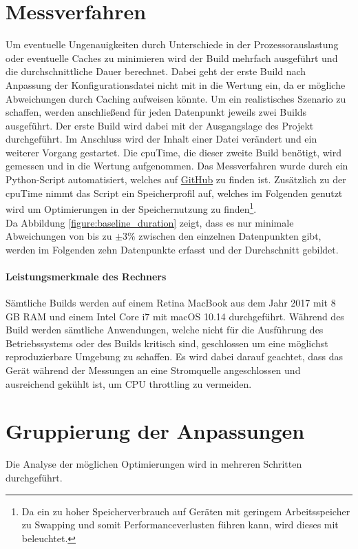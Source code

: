 \documentclass[11pt]{report}
\begin{document}
		\section{Messverfahren}
			Um eventuelle Ungenauigkeiten durch Unterschiede in der Prozessorauslastung oder eventuelle Caches zu minimieren wird der Build mehrfach ausgeführt und die durchschnittliche Dauer berechnet. Dabei geht der erste Build nach Anpassung der Konfigurationsdatei nicht mit in die Wertung ein, da er mögliche Abweichungen durch Caching aufweisen könnte. Um ein realistisches Szenario zu schaffen, werden anschließend für jeden Datenpunkt jeweils zwei Builds ausgeführt. Der erste Build wird dabei mit der Ausgangslage des Projekt durchgeführt. Im Anschluss wird der Inhalt einer Datei verändert und ein weiterer Vorgang gestartet. Die \Gls{cpuTime}, die dieser zweite Build benötigt, wird gemessen und in die Wertung aufgenommen. Das Messverfahren wurde durch ein Python-Script automatisiert, welches auf \href{https://github.com/TexNAK/WebBundlerOptimization/blob/40c8c00dee7af6970bc82c29e2fc0f3cfd6c12eb/webpack-project/runBuilds.py}{GitHub} zu finden ist. Zusätzlich zu der \Gls{cpuTime} nimmt das Script ein Speicherprofil auf, welches im Folgenden genutzt wird um Optimierungen in der Speichernutzung zu finden\footnote{Da ein zu hoher Speicherverbrauch auf Geräten mit geringem Arbeitsspeicher zu Swapping und somit Performanceverlusten führen kann, wird dieses mit beleuchtet.}.\\
			Da Abbildung \ref{figure:baseline_duration} zeigt, dass es nur minimale Abweichungen von bis zu $\pm 3 \%$ zwischen den einzelnen Datenpunkten gibt, werden im Folgenden zehn Datenpunkte erfasst und der Durchschnitt gebildet.
			
			\paragraph{Leistungsmerkmale des Rechners} Sämtliche Builds werden auf einem Retina MacBook aus dem Jahr 2017 mit 8 GB RAM und einem Intel Core i7 mit macOS 10.14 durchgeführt. Während des Build werden sämtliche Anwendungen, welche nicht für die Ausführung des Betriebssystems oder des Builds kritisch sind, geschlossen um eine möglichst reproduzierbare Umgebung zu schaffen. Es wird dabei darauf geachtet, dass das Gerät während der Messungen an eine Stromquelle angeschlossen und ausreichend gekühlt ist, um CPU throttling zu vermeiden.

		\section{Gruppierung der Anpassungen}
			Die Analyse der möglichen Optimierungen wird in mehreren Schritten durchgeführt.
\end{document}
